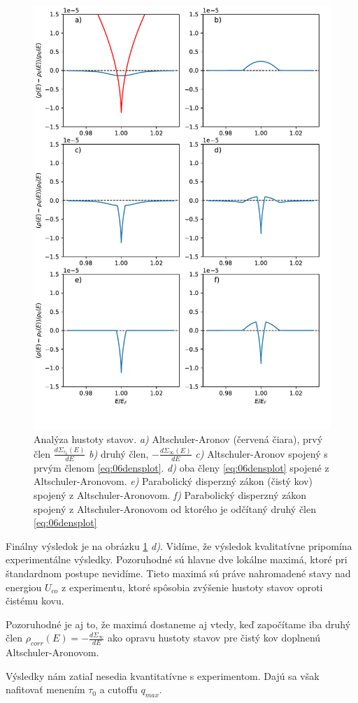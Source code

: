\begin{figure}[H]
\centering
\includegraphics[scale=0.8]{grafy/plot_tau_1_c_1}
\caption{Analýza hustoty stavov. {\it a)} Altschuler-Aronov (červená čiara), prvý člen $\frac{d\Sigma_{\tau_0}(E)}{dE}$ {\it b)} druhý člen, $-\frac{d\Sigma_{\infty}(E)}{dE}$  {\it c)} Altschuler-Aronov spojený s prvým členom  \eqref{eq:06densplot}. {\it d)} oba členy \eqref{eq:06densplot} spojené z Altschuler-Aronovom. {\it e)} Parabolický disperzný zákon (čistý kov) spojený z Altschuler-Aronovom. {\it f)} Parabolický disperzný zákon spojený z Altschuler-Aronovom od ktorého je odčítaný druhý člen \eqref{eq:06densplot}}
\label{fig:results}
\end{figure}

Finálny výsledok je na obrázku \ref{fig:results} {\it d)}. Vidíme, že výsledok kvalitatívne pripomína experimentálne výsledky. Pozoruhodné sú hlavne dve lokálne maximá, ktoré pri štandardnom postupe nevidíme. Tieto maximá sú práve nahromadené stavy nad energiou $U_{co}$ z experimentu, ktoré spôsobia zvýšenie hustoty stavov oproti čistému kovu. 

Pozoruhodné je aj to, že maximá dostaneme aj vtedy, keď započítame iba druhý člen  $\rho_{corr}(E)=-\frac{d\Sigma_{\infty}}{dE}$ ako opravu hustoty stavov pre čistý kov doplnenú Altschuler-Aronovom.

Výsledky nám zatiaľ nesedia kvantitatívne s experimentom. Dajú sa však nafitovať menením $\tau_0$ a cutoffu $q_{max}$.
